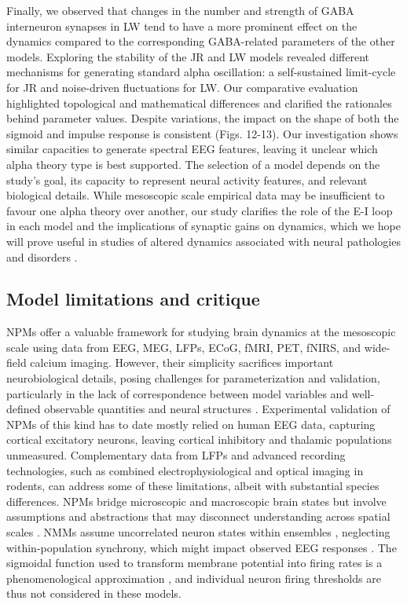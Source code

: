 \documentclass[12pt,twoside]{article}
\begin{document}
Finally, we observed that changes in the number and strength of GABA interneuron synapses in LW tend to have a more prominent effect on the dynamics compared to the corresponding GABA-related parameters of the other models.
Exploring the stability of the JR and LW models revealed different mechanisms for generating standard alpha oscillation: a self-sustained limit-cycle for JR and noise-driven fluctuations for LW. 
Our comparative evaluation highlighted topological and mathematical differences and clarified the rationales behind parameter values. Despite variations, the impact on the shape of both the sigmoid and impulse response is consistent (Figs. 12-13). Our investigation shows similar capacities to generate spectral EEG features, leaving it unclear which alpha theory type is best supported. The selection of a model depends on the study's goal, its capacity to represent neural activity features, and relevant biological details. While mesoscopic scale empirical data may be insufficient to favour one alpha theory over another, our study clarifies the role of the E-I loop in each model and the implications of synaptic gains on dynamics, which we hope will prove useful in studies of altered dynamics associated with neural pathologies and disorders \citep{eichler2008ei, li2022excitation}.


\subsection{Model limitations and critique}
NPMs offer a valuable framework for studying brain dynamics at the mesoscopic scale using data from EEG, MEG, LFPs, ECoG, fMRI, PET, fNIRS, and wide-field calcium imaging. However, their simplicity sacrifices important neurobiological details, posing challenges for parameterization and validation, particularly in the lack of correspondence between model variables and well-defined observable quantities and neural structures \citep{cook2021neural}. Experimental validation of NPMs of this kind has to date mostly relied on human EEG data, capturing cortical excitatory neurons, leaving cortical inhibitory and thalamic populations unmeasured. Complementary data from LFPs and advanced recording technologies, such as combined electrophysiological and optical imaging in rodents, can address some of these limitations, albeit with substantial species differences. NPMs bridge microscopic and macroscopic brain states but involve assumptions and abstractions that may disconnect understanding across spatial scales \citep{goldman2019bridging, huang2021novel, cook2021neural}. NMMs assume uncorrelated neuron states within ensembles \citep{breakspear2017dynamic}, neglecting within-population synchrony, which might impact observed EEG responses \citep{glomb2021computational}. The sigmoidal function used to transform membrane potential into firing rates is a phenomenological approximation \citep{huang2021novel, byrne2020next}, and individual neuron firing thresholds are thus not considered in these models.
\end{document}
